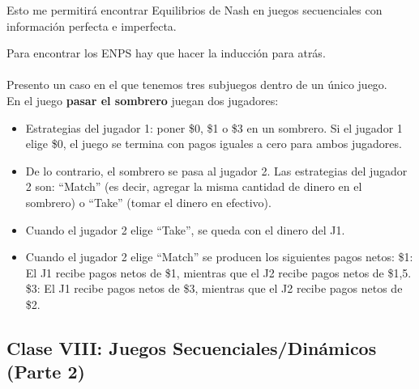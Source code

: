 \documentclass{article}
\begin{document}
                Esto me permitirá encontrar Equilibrios de Nash en juegos secuenciales con información perfecta e imperfecta.

                Para encontrar los ENPS hay que hacer la inducción para atrás. \\
                \\
                Presento un caso en el que tenemos tres subjuegos dentro de un único juego. \\
                En el juego \textbf{pasar el sombrero} juegan dos jugadores:
                \begin{itemize}
                    \item Estrategias del jugador 1: poner \$0, \$1 o \$3 en un sombrero. Si el jugador 1 elige \$0, el juego se termina con pagos iguales a cero para ambos jugadores.
                    \item De lo contrario, el sombrero se pasa al jugador 2. Las estrategias del jugador 2 son: “Match” (es decir, agregar la misma cantidad de dinero en el sombrero) o “Take” (tomar el dinero en efectivo).
                    \item Cuando el jugador 2 elige “Take”, se queda con el dinero del J1.
                    \item Cuando el jugador 2 elige “Match” se producen los siguientes pagos netos:
                    \subitem \$1: El J1 recibe pagos netos de \$1, mientras que el J2 recibe pagos netos de \$1,5.
                    \subitem \$3: El J1 recibe pagos netos de \$3, mientras que el J2 recibe pagos netos de \$2.
                \end{itemize}
        \subsection*{Clase VIII: Juegos Secuenciales/Dinámicos (Parte 2)}
\end{document}
